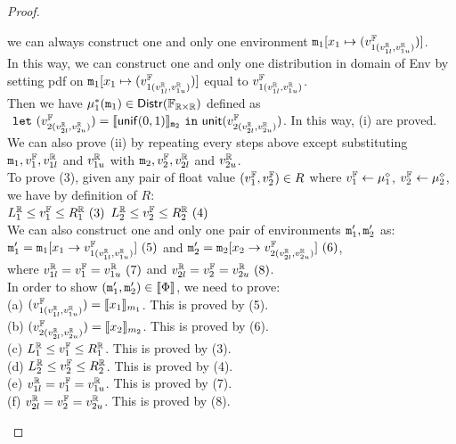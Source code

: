 \documentclass[a4paper,11pt]{article}
\begin{document}
\begin{proof}
\begin{itemize}
\begin{subproof}
	we can always construct one and only one environment $\mathtt{m}_1[x_1 \mapsto (v^{\mathbb{F}}_{1(v^{\mathbb{R}}_{1l}, v^{\mathbb{R}}_{1u})})]$.
	\\
	In this way, we can construct one and only one distribution in domain of Env 
	by setting pdf on 
	$\mathtt{m}_1[x_1 \mapsto (v^{\mathbb{F}}_{1(v^{\mathbb{R}}_{1l}, v^{\mathbb{R}}_{1u})})]$
	equal to 
	$v^{\mathbb{F}}_{1(v^{\mathbb{R}}_{1l}, v^{\mathbb{R}}_{1u})}$.
	\\
	Then we have $\mu^*_1(\mathtt{m}_1) \in \mathsf{Distr}(\mathbb{F}_{\mathbb{R} \times \mathbb{R}})$ defined as 
	$~\mathtt{let}~ (v^{\mathbb{F}}_{2(v^{\mathbb{R}}_{2l}, v^{\mathbb{R}}_{2u})}) 
	= \llbracket \mathsf{unif}(0, 1) \rrbracket_{\mathtt{m}_2} 
	~\mathtt{in}~
	\mathsf{unit}(v^{\mathbb{F}}_{2(v^{\mathbb{R}}_{2l}, v^{\mathbb{R}}_{2u})})$.
	In this way, (i) are proved.
	\\
	We can also prove (ii) by repeating every steps above except substituting $\mathtt{m}_1, v^{\mathbb{F}}_1, v^{\mathbb{R}}_{1l}$ and $v^{\mathbb{R}}_{1u}$ with $\mathtt{m}_2, v^{\mathbb{F}}_2, v^{\mathbb{R}}_{2l}$ and $v^{\mathbb{R}}_{2u}$.
	\\
	To prove (3), given any pair of float value $(v^{\mathbb{F}}_1, v^{\mathbb{F}}_2) \in R$ where 
	$v^{\mathbb{F}}_1 \leftarrow \mu_1^{\diamond}$, $v^{\mathbb{F}}_2 \leftarrow \mu_2^{\diamond}$, we have by definition of $R$:
	\\
	$L^{\mathbb{R}}_1 \leq v^{\mathbb{F}}_1 \leq R^{\mathbb{R}}_1 ~ (3)$
	$L^{\mathbb{R}}_2 \leq v^{\mathbb{F}}_2 \leq R^{\mathbb{R}}_2 ~ (4)$
	\\
	We can also construct one and only one pair of environments $\mathtt{m}_1', \mathtt{m}_2'$ as:
	\\
	$\mathtt{m}_1' = \mathtt{m}_1[x_1 \to v^{\mathbb{F}}_{1(v^{\mathbb{R}}_{1l}, v^{\mathbb{R}}_{1u})}] ~ (5)$ and
	$\mathtt{m}_2' = \mathtt{m}_2[x_2 \to v^{\mathbb{F}}_{2(v^{\mathbb{R}}_{2l}, v^{\mathbb{R}}_{2u})}] ~ (6)$,
	\\
	where $v^{\mathbb{R}}_{1l} = v^{\mathbb{F}}_1 = v^{\mathbb{R}}_{1u} ~ (7)$ and $v^{\mathbb{R}}_{2l} = v^{\mathbb{F}}_2 = v^{\mathbb{R}}_{2u} ~ (8)$.
	\\
	In order to show $(\mathtt{m}_1', \mathtt{m}_2') \in \llbracket \Phi \rrbracket$, we need to prove:
	\\
	(a)	$(v^{\mathbb{F}}_{1(v^{\mathbb{R}}_{1l}, v^{\mathbb{R}}_{1u})}) = \llbracket x_1 \rrbracket_{m_1}$.
	This is proved by (5).
	\\
	(b) $(v^{\mathbb{F}}_{2(v^{\mathbb{R}}_{2l}, v^{\mathbb{R}}_{2u})}) = \llbracket x_2 \rrbracket_{m_2}$.
	This is proved by (6).
	\\
	(c) $L^{\mathbb{R}}_1 \leq v^{\mathbb{F}}_1 \leq R^{\mathbb{R}}_1$.
	This is proved by (3).
	\\
	(d) $L^{\mathbb{R}}_2 \leq v^{\mathbb{F}}_2 \leq R^{\mathbb{R}}_2$.
	This is proved by (4).
	\\
	(e) $v^{\mathbb{R}}_{1l} = v^{\mathbb{F}}_1 = v^{\mathbb{R}}_{1u}$.
	This is proved by (7).
	\\ 
	(f) $v^{\mathbb{R}}_{2l} = v^{\mathbb{F}}_2 = v^{\mathbb{R}}_{2u}$.
	This is proved by (8).

\end{subproof}
\end{itemize}
\end{proof}
\end{document}
